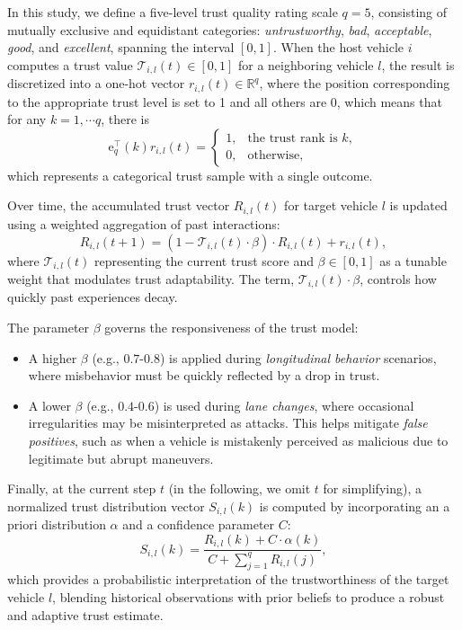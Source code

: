 \documentclass[letterpaper, 10pt, conference]{ieeeconf}  %
\def\T{\mathcal{T}} %
\begin{document}
In this study, we define a five-level trust quality rating scale $q = 5$, consisting of mutually exclusive and equidistant categories: \textit{untrustworthy}, \textit{bad}, \textit{acceptable}, \textit{good}, and \textit{excellent}, spanning the interval $[0, 1]$. When the host vehicle $i$ computes a trust value $\T_{i,l}(t) \in [0, 1]$ for a neighboring vehicle $l$, the result is discretized into a one-hot vector $r_{i,l}(t) \in \mathbb{R}^q$, where the position corresponding to the appropriate trust level is set to 1 and all others are 0, which means that for any $k = 1, \cdots q$, there is
\begin{equation}
    \text{e}_{q}^{\top}(k)r_{i,l} (t) = \begin{cases}
        1, & \text {the trust rank is $k$}, \\
        0 , & \text {otherwise},
    \end{cases}
\end{equation}
which represents a categorical trust sample with a single outcome. 

Over time, the accumulated trust vector $R_{i,l}(t)$ for target vehicle $l$ is updated using a weighted aggregation of past interactions: 
\begin{equation}
    R_{i,l}(t + 1) = \left(1 - \T_{i,l}(t) \cdot \beta \right) \cdot R_{i,l}(t) + r_{i,l}(t),
\end{equation}
where $\T_{i,l}(t)$ representing the current trust score and $\beta \in [0, 1]$ as a tunable weight that modulates trust adaptability. 
The term, $\T_{i,l}(t) \cdot \beta$, controls how quickly past experiences decay. 

The parameter $\beta$ governs the responsiveness of the trust model:
\begin{itemize}
    \item A higher $\beta$ (e.g., $0.7$-$0.8$) is applied during \textit{longitudinal behavior} scenarios, where misbehavior must be quickly reflected by a drop in trust.
    \item A lower $\beta$ (e.g., $0.4$-$0.6$) is used during \textit{lane changes}, where occasional irregularities may be misinterpreted as attacks. This helps mitigate \textit{false positives}, such as when a vehicle is mistakenly perceived as malicious due to legitimate but abrupt maneuvers.
\end{itemize}

Finally, at the current step $t$ (in the following, we omit $t$ for simplifying), a normalized trust distribution vector $S_{i,l}(k)$ is computed by incorporating an a priori distribution $\alpha$ and a confidence parameter $C$:
\begin{equation}
    S_{i,l}(k) = \dfrac{R_{i,l}(k) + C \cdot \alpha(k)}{C + \sum_{j=1}^{q} R_{i,l}(j)},
\end{equation}
which provides a probabilistic interpretation of the trustworthiness of the target vehicle $l$, blending historical observations with prior beliefs to produce a robust and adaptive trust estimate. 
\end{document}
